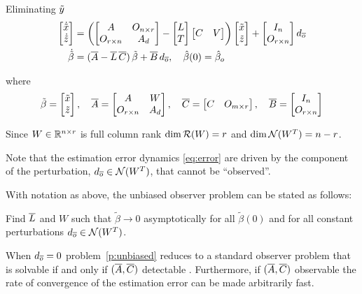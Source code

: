 \documentclass[preprint,review,11pt]{elsarticle}
\begin{document}
Eliminating ${\tilde{y}}$ 
\begin{align}
\bM
\dot{\tx}\\ \dot{\tz}
\eM
&=
\left(
\bM
A & O_{n \times r} \\ 
O_{r \times n} & A_d
\eM
-
\bM
L \\ T 
\eM
\bM
C & V
\eM
\right)
\bM
\tx \\ \tz 
\eM
+
\bM
I_n \\ O_{r \times n} 
\eM
d_{\ol{o}}
\\
\dot{\tilde{\beta}} 
&= 
(\ol{A} - \ol{L} \, \ol{C}) \, \tilde{\beta}  
+ \ol{B} \, d_{\ol{o}}, \quad \hat{\beta}(0) = \hat{\beta}_o
\label{eq:error}
\end{align}

where 
\begin{equation}
\tilde{\beta} = \bM \tx \\ \tz \eM
,\quad
\ol{A} = \bM A &  W \\ O_{r \times n} & A_d \eM
,\quad
\ol{C} = \bM C & O_{m  \times r} \eM
,\quad
\ol{B} = \bM I_n \\ O_{r \times n} \eM
\label{eq:est_err}
\end{equation}

\begin{rem}
Since $W\in{\mathbb{R}^{n \times r}}$ is full column rank $\dim {\cal R}(W) =r$ and 
$\dim {\cal N}(W^T) =n-r$.
\end{rem}


Note that the estimation error dynamics \eqref{eq:error}
are driven by the component of the perturbation, $d_{\overline{o}}\in{\cal N}(W^T)$, that cannot be ``observed''.

With notation as above, the unbiased observer problem can be stated as follows:

\begin{prob} \label{p:unbiased}
Find $\overline{L}$ and $W$ such that $\tilde{\beta} \rightarrow 0 $ asymptotically for all $\tilde{\beta}(0)$ and for all constant perturbations $d_{\overline{o}} \in {\cal N}(W^T)$.
\end{prob}

When $d_{\overline{o}}=0$ problem~\ref{p:unbiased} reduces to a standard observer problem that is solvable if and only if
$(\overline{A},\overline{C})$ detectable \cite{KAIL1980a}. 
Furthermore, if $(\overline{A},\overline{C})$ observable the rate of 
convergence of the estimation error can be made arbitrarily fast.  
\end{document}
